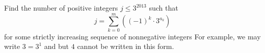 Find the number of positive integers $j\leq 3^{2013}$ such that \[j=\sum_{k=0}^m\left((-1)^k\cdot 3^{a_k}\right)\] for some strictly increasing sequence of nonnegative integers   For example, we may write $3=3^1$ and  but $4$ cannot be written in this form.